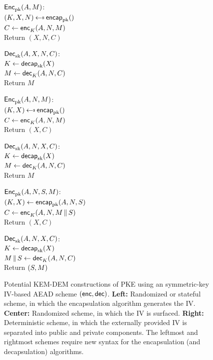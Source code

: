 \begin{figure}
\begin{center}
{
\underline{${\mathsf{Enc}}_{\mathrm{pk}}^{}(A, M)$}:\\[2pt]
$(K,X,\pubiv) \getsr \encap_\pk()$\\
$C \gets {\mathsf{enc}}_{K}^{}(A,N,M)$\\
Return $(X,N,C)$

\medskip
\underline{${\mathsf{Dec}}_{\mathrm{sk}}^{}(A,X,N,C)$}:\\[2pt]
$K \gets \mathsf{decap}_{\mathrm{sk}}(X)$\\
$M \gets {\mathsf{dec}}_{K}^{}(A,N,C)$\\
Return $M$
}
{
\underline{${\mathsf{Enc}}_{\mathrm{pk}}^{}(A,N,M)$}:\\[2pt]
$(K,X) \getsr \encap_\pk()$\\
$C \gets {\mathsf{enc}}_{K}^{}(A,N,M)$\\
Return $(X,C)$

\medskip
\underline{${\mathsf{Dec}}_{\mathrm{sk}}^{}(A,N,X,C)$}:\\[2pt]
$K \gets \mathsf{decap}_{\mathrm{sk}}(X)$\\
$M \gets {\mathsf{dec}}_{K}^{}(A,N,C)$\\
Return $M$

}
{
\underline{${\mathsf{Enc}}_{\mathrm{pk}}^{}(A,N,S,M)$}:\\[2pt]
$(K,X) \gets \mathsf{encap}_{\mathrm{pk}}(A,N,S)$\\
$C \gets {\mathsf{enc}}_{K}^{}(A,N,M \,\|\, S)$\\
Return $(X,C)$

\medskip
\underline{${\mathsf{Dec}}_{\mathrm{sk}}^{}(A,N,X,C)$}:\\[2pt]
$K \gets \mathsf{decap}_{\mathrm{sk}}(X)$\\
$M \,\|\, S \gets {\mathsf{dec}}_{K}^{}(A,N,C)$\\
Return $(S,M)$
}
\caption{Potential KEM-DEM constructions of PKE using an symmetric-key IV-based AEAD scheme $({\mathsf{enc}},{\mathsf{dec}})$. \textbf{Left:} Randomized or stateful scheme, in which the encapsulation algorithm generates the IV.  \textbf{Center:} Randomized scheme, in which the IV is surfaced.  \textbf{Right:} Deterministic scheme, in which the externally provided IV is separated into public and private components. The leftmost and rightmost schemes require new syntax for the encapsulation (and decapsulation) algorithms.}
\label{fig:kem-dem options}
\end{center}
\end{figure}


